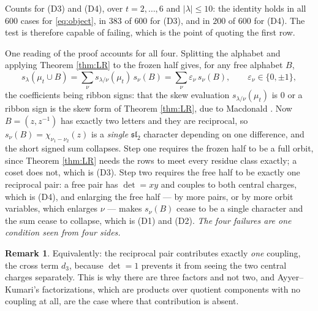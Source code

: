 \documentclass[11pt,reqno]{amsart}
\theoremstyle{plain}
\theoremstyle{definition}
\newtheorem{remark}[theorem]{Remark}
\newcommand{\zt}{\mu_t}
\begin{document}
Counts for (D3) and (D4), over $t=2,\dots,6$ and $|\lambda|\le10$: the identity holds in all $600$
cases for \eqref{eq:object}, in $383$ of $600$ for (D3), and in $200$ of $600$ for (D4). The test is
therefore capable of failing, which is the point of quoting the first row.

One reading of the proof accounts for all four. Splitting the alphabet and applying Theorem
\ref{thm:LR} to the frozen half gives, for any free alphabet $B$,
\begin{equation}\label{eq:threestep}
s_\lambda(\zt\cup B)=\sum_{\nu}s_{\lambda/\nu}(\zt)\,s_\nu(B)=\sum_\nu\varepsilon_\nu\,s_\nu(B),
\qquad \varepsilon_\nu\in\{0,\pm1\},
\end{equation}
the coefficients being ribbon signs: that the skew evaluation $s_{\lambda/\nu}(\zt)$ is $0$ or a
ribbon sign is the skew form of Theorem \ref{thm:LR}, due to Macdonald \cite[p.~91]{Mac95}. Now
$B=(z,z^{-1})$ has exactly two letters and they are
reciprocal, so $s_\nu(B)=\chi_{\nu_1-\nu_2}(z)$ is a \emph{single} $\mathfrak{sl}_2$ character
depending on one difference, and the short signed sum collapses. Step one requires the frozen half
to be a full orbit, since Theorem \ref{thm:LR} needs the rows to meet every residue class exactly;
a coset does not, which is (D3). Step two requires the free half to be exactly one reciprocal pair:
a free pair has $\det=xy$ and couples to both central charges, which is (D4), and enlarging the free
half --- by more pairs, or by more orbit variables, which enlarges $\nu$ --- makes $s_\nu(B)$ cease
to be a single character and the sum cease to collapse, which is (D1) and (D2). \emph{The four
failures are one condition seen from four sides.}

\begin{remark}
Equivalently: the reciprocal pair contributes exactly \emph{one} coupling, the cross term $d_3$,
because $\det=1$ prevents it from seeing the two central charges separately. This is why there are
three factors and not two, and Ayyer--Kumari's factorizations, which are products over quotient
components with no coupling at all, are the case where that contribution is absent.
\end{remark}
\end{document}
